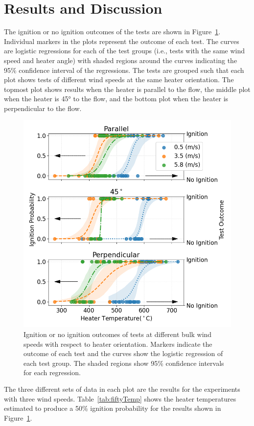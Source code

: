 \section{Results and Discussion}
\label{sec:results2}
    The ignition or no ignition outcomes of the tests are shown in Figure~\ref{fig:heaterAngle}. Individual markers in the plots represent the outcome of each test. The curves are logistic regressions for each of the test groups (i.e., tests with the same wind speed and heater angle) with shaded regions around the curves indicating the 95\% confidence interval of the regressions. The tests are grouped such that each plot shows tests of different wind speeds at the same heater orientation. The topmost plot shows results when the heater is parallel to the flow, the middle plot when the heater is 45\si{\degree} to the flow, and the bottom plot when the heater is perpendicular to the flow. 
        \begin{figure}[hpbt]
            \centering
            \includegraphics[width=0.5\columnwidth]{Figures/heat_angle_hist_names.png}
            \caption{Ignition or no ignition outcomes of tests at different bulk wind speeds with respect to heater orientation. Markers indicate the outcome of each test and the curves show the logistic regression of each test group. The shaded regions show 95\% confidence intervals for each regression.}
            \label{fig:heaterAngle}
        \end{figure}
    The three different sets of data in each plot are the results for the experiments with three wind speeds. Table~\ref{tab:fiftyTemp} shows the heater temperatures estimated to produce a 50\% ignition probability for the results shown in Figure~\ref{fig:heaterAngle}.
